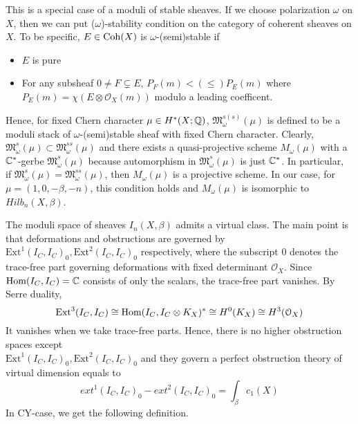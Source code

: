\begin{rem}
    This is a special case of a moduli of stable sheaves. If we choose polarization $\omega$ on $X$, then we can put ($\omega$)-stability condition on the category of coherent sheaves on $X$. To be specific, $E \in \mathrm{Coh}(X)$ is $\omega$-(semi)stable if 
    \begin{itemize}
        \item $E$ is pure
        \item For any subsheaf $0 \neq F \subsetneq E$, $P_F(m)<(\leq)P_E(m)$ where $P_E(m)=\chi(E \otimes \mathcal{O}_X(m))$ modulo a leading coefficent. 
    \end{itemize} 
    Hence, for fixed Chern character $\mu \in H^*(X;\mathbb Q)$, $\mathfrak{M}^{s(s)}_{\omega}(\mu)$ is defined to be a moduli stack of $\omega$-(semi)stable sheaf with fixed Chern character. Clearly, $\mathfrak{M}^s_{\omega}(\mu) \subset \mathfrak{M}^{ss}_{\omega}(\mu)$ and there exists a quasi-projective scheme $M_{\omega}(\mu)$ with a $\mathbb C^*$-gerbe $\mathfrak{M}^s_{\omega}(\mu)$ because automorphism in $\mathfrak{M}^s_{\omega}(\mu)$ is just $\mathbb C^*$. In particular, \\
    if $\mathfrak{M}^s_{\omega}(\mu)=\mathfrak{M}^{ss}_{\omega}(\mu)$, then $M_{\omega}(\mu)$ is a projective scheme. In our case, for $\mu=(1, 0, -\beta, -n)$, this condition holds and $M_{\omega}(\mu)$ is isomorphic to $Hilb_n(X,\beta)$.
\end{rem}
The moduli space of sheaves $I_n(X,\beta)$ admits a virtual class. The main point is that deformations and obstructions are governed by $\text{Ext}^1(I_C, I_C)_0, \text{Ext}^2(I_C, I_C)_0$ respectively, where the subscript 0 denotes the trace-free part governing deformations with fixed determinant $\mathcal{O}_X$. Since $\text{Hom}(I_C, I_C)=\mathbb C$ consists of only the scalars, the trace-free part vanishes. By Serre duality, 
\begin{equation*}
    \operatorname{Ext}^3(I_C, I_C) \cong \operatorname{Hom}(I_C, I_C \otimes K_X)^* \cong H^0(K_X) \cong H^3(\mathcal{O}_X)
\end{equation*}
It vanishes when we take trace-free parts. Hence, there is no higher obstruction spaces except\\ $\text{Ext}^1(I_C, I_C)_0, \text{Ext}^2(I_C, I_C)_0$ and they govern a perfect obstruction theory of virtual dimension equals to 
\begin{equation*}
    ext^1(I_C, I_C)_0-ext^2(I_C, I_C)_0= \int_{\beta}c_1(X)
\end{equation*}
In CY-case, we get the following definition.

